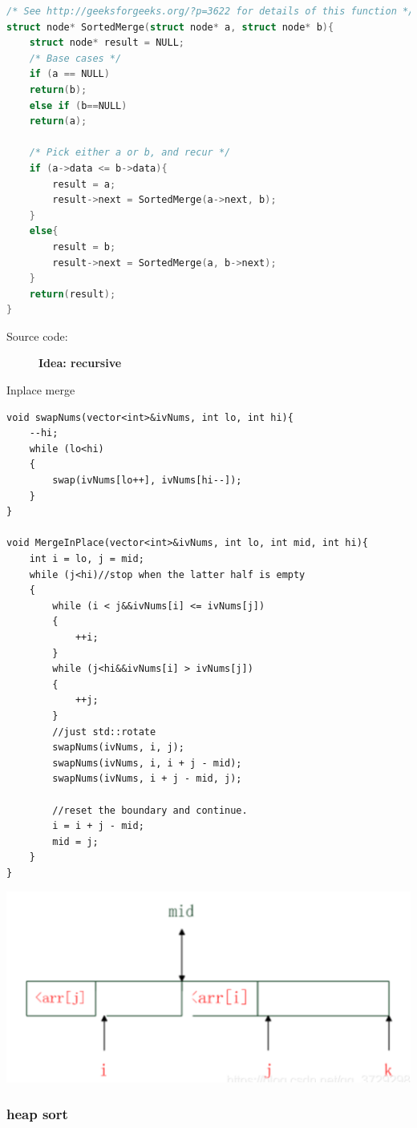 \documentclass[a4paper,11pt,twoside]{book}
\begin{document}
\begin{lstlisting}[frame=single, language=c++] 
/* See http://geeksforgeeks.org/?p=3622 for details of this function */
struct node* SortedMerge(struct node* a, struct node* b){
	struct node* result = NULL;	
	/* Base cases */
	if (a == NULL)
	return(b);
	else if (b==NULL)
	return(a);
	
	/* Pick either a or b, and recur */
	if (a->data <= b->data){
		result = a;
		result->next = SortedMerge(a->next, b);
	}
	else{
		result = b;
		result->next = SortedMerge(a, b->next);
	}
	return(result);
}	
\end{lstlisting}
\begin{description}
	\item[Source code:] \textbf{Idea: recursive}
\end{description}

	\par Inplace merge
\begin{lstlisting}
void swapNums(vector<int>&ivNums, int lo, int hi){
	--hi;
	while (lo<hi)
	{
		swap(ivNums[lo++], ivNums[hi--]);
	}
}

void MergeInPlace(vector<int>&ivNums, int lo, int mid, int hi){
	int i = lo, j = mid;
	while (j<hi)//stop when the latter half is empty
	{
		while (i < j&&ivNums[i] <= ivNums[j])
		{
			++i;
		}
		while (j<hi&&ivNums[i] > ivNums[j])
		{
			++j;
		}
		//just std::rotate
		swapNums(ivNums, i, j);
		swapNums(ivNums, i, i + j - mid);
		swapNums(ivNums, i + j - mid, j);
		
		//reset the boundary and continue.
		i = i + j - mid;
		mid = j;
	}
}
\end{lstlisting}

\begin{center}
	\includegraphics[scale=0.45]{pics/inplace}
\end{center}

\subsubsection{heap sort}
\end{document}
